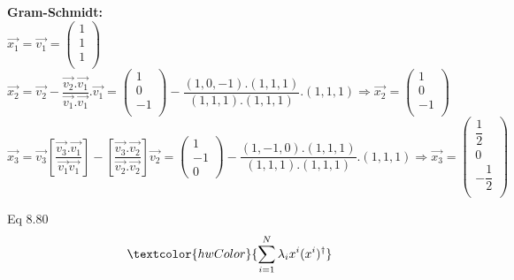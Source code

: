 \documentclass[fleqn]{article}
\begin{document}
\begin{enumerate}
      \bigbreak
      
      \textcolor{hwColor}{
        \textbf{Gram-Schmidt:} \\
        $\overrightarrow{x_1}=\overrightarrow{v_1}=\begin{pmatrix}
          1 \\
          1 \\
          1 \\
        \end{pmatrix}$ \\
        $
          \overrightarrow{x_2}=\overrightarrow{v_2}-\dfrac{\overrightarrow{v_2}.\overrightarrow{v_1}}{\overrightarrow{v_1}.\overrightarrow{v_1}}.\overrightarrow{v_1}
          =\begin{pmatrix}
            1 \\
            0 \\
            -1 \\
          \end{pmatrix}-\dfrac{(1,0,-1).(1,1,1)}{(1,1,1).(1,1,1)}.(1,1,1) \Longrightarrow \overrightarrow{x_2}=\begin{pmatrix}
            1 \\
            0 \\
            -1 \\
          \end{pmatrix}
        $ \\
        $
        \overrightarrow{x_3}=\overrightarrow{v_3}\left[\dfrac{\overrightarrow{v_3}.\overrightarrow{v_1}}{\overrightarrow{v_1}\overrightarrow{v_1}}\right]-\left[\dfrac{\overrightarrow{v_3}.\overrightarrow{v_2}}{\overrightarrow{v_2}.\overrightarrow{v_2}}\right]\overrightarrow{v_2}=\begin{pmatrix}
          1 \\
          -1 \\
          0
        \end{pmatrix}-\dfrac{(1,-1,0).(1,1,1)}{(1,1,1).(1,1,1)}.(1,1,1) \Longrightarrow \overrightarrow{x_3}=\begin{pmatrix}
          \dfrac{1}{2} \\
          0 \\
          -\dfrac{1}{2} \\
        \end{pmatrix}
        $
      }

      \textcolor{hwColor}{
        Eq 8.80
      }
      \begin{equation}
        \textcolor{hwColor}{
          \sum^{N}_{i=1} \lambda_i x^i(x^i)^\dagger 
         }
      \end{equation}



\end{enumerate}
\end{document}
